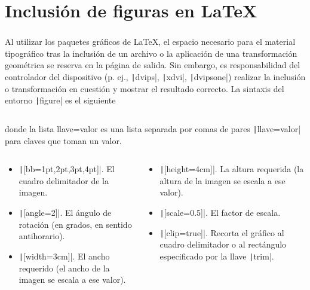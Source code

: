 \section{Inclusión de figuras en \LaTeX}

\begin{frame}[fragile]
	\frametitle{\secname}

	Al utilizar los paquetes gráficos de \LaTeX, el espacio necesario
	para el material tipográfico tras la inclusión de un archivo o la
	aplicación de una transformación geométrica se reserva en la página
	de salida.
	Sin embargo, es responsabilidad del controlador del dispositivo
	(p. ej., \texttt|dvips|, \texttt|xdvi|,
	\texttt|dvipsone|) realizar la inclusión o
	transformación en cuestión y mostrar el resultado correcto.
	La sintaxis del entorno \texttt|figure| es el siguiente
	\inputminted[fontsize=\tiny,frame=single]{latex}{sections/figure.tex}
	donde la lista llave=valor es una lista separada por comas de
	pares \texttt|llave=valor| para claves que toman un
	valor.
	\begin{columns}
		\begin{column}{.48\paperwidth}
			\begin{itemize}
				\item

				      \texttt|[bb={1pt,2pt,3pt,4pt}]|.
				      El cuadro delimitador de la imagen.

				\item

				      \texttt|[angle=2]|.
				      El ángulo de rotación (en grados, en sentido
				      antihorario).

				\item

				      \texttt|[width=3cm]|.
				      El ancho requerido (el ancho de la imagen se escala a
				      ese valor).
			\end{itemize}
		\end{column}
		\begin{column}{.48\paperwidth}
			\begin{itemize}
				\item

				      \texttt|[height=4cm]|.
				      La altura requerida (la altura de la imagen se escala a
				      ese valor).

				\item

				      \texttt|[scale=0.5]|.
				      El factor de escala.

				\item

				      \texttt|[clip=true]|.
				      Recorta el gráfico al cuadro delimitador o al
				      rectángulo especificado por la llave
				      \texttt|trim|.
			\end{itemize}
		\end{column}
	\end{columns}

	\begin{example}\end{example} %
\end{frame}
